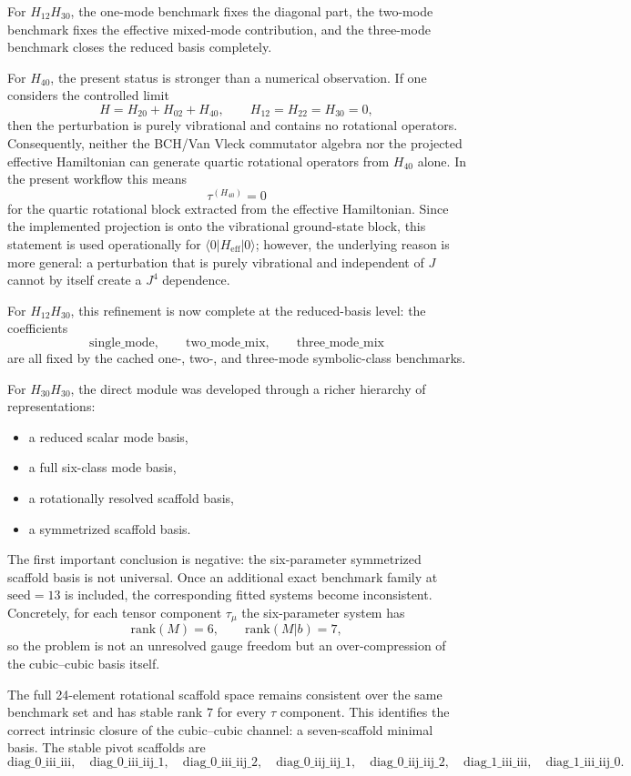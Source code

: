 \documentclass[11pt,a4paper]{article}
\begin{document}
For \(H_{12}H_{30}\), the one-mode benchmark fixes the diagonal part, the two-mode benchmark fixes the effective mixed-mode contribution, and the three-mode benchmark closes the reduced basis completely.

For \(H_{40}\), the present status is stronger than a numerical observation. If one considers the controlled limit
\[
H = H_{20}+H_{02}+H_{40},
\qquad
H_{12}=H_{22}=H_{30}=0,
\]
then the perturbation is purely vibrational and contains no rotational operators. Consequently, neither the BCH/Van Vleck commutator algebra nor the projected effective Hamiltonian can generate quartic rotational operators from \(H_{40}\) alone. In the present workflow this means
\[
\tau^{(H_{40})}=0
\]
for the quartic rotational block extracted from the effective Hamiltonian. Since the implemented projection is onto the vibrational ground-state block, this statement is used operationally for \(\langle 0|H_{\mathrm{eff}}|0\rangle\); however, the underlying reason is more general: a perturbation that is purely vibrational and independent of \(J\) cannot by itself create a \(J^4\) dependence.

For \(H_{12}H_{30}\), this refinement is now complete at the reduced-basis level: the coefficients
\[
\mathrm{single\_mode},\qquad \mathrm{two\_mode\_mix},\qquad \mathrm{three\_mode\_mix}
\]
are all fixed by the cached one-, two-, and three-mode symbolic-class benchmarks.

For \(H_{30}H_{30}\), the direct module was developed through a richer hierarchy of representations:
\begin{itemize}[leftmargin=*]
\item a reduced scalar mode basis,
\item a full six-class mode basis,
\item a rotationally resolved scaffold basis,
\item a symmetrized scaffold basis.
\end{itemize}

The first important conclusion is negative: the six-parameter symmetrized scaffold basis is not universal. Once an additional exact benchmark family at \(\mathrm{seed}=13\) is included, the corresponding fitted systems become inconsistent. Concretely, for each tensor component \(\tau_\mu\) the six-parameter system has
\[
\mathrm{rank}(M)=6,\qquad \mathrm{rank}(M|b)=7,
\]
so the problem is not an unresolved gauge freedom but an over-compression of the cubic--cubic basis itself.

The full 24-element rotational scaffold space remains consistent over the same benchmark set and has stable rank \(7\) for every \(\tau\) component. This identifies the correct intrinsic closure of the cubic--cubic channel: a seven-scaffold minimal basis. The stable pivot scaffolds are
\[
\mathrm{diag\_0\_iii\_iii},\quad
\mathrm{diag\_0\_iii\_iij\_1},\quad
\mathrm{diag\_0\_iii\_iij\_2},\quad
\mathrm{diag\_0\_iij\_iij\_1},\quad
\mathrm{diag\_0\_iij\_iij\_2},\quad
\mathrm{diag\_1\_iii\_iii},\quad
\mathrm{diag\_1\_iii\_iij\_0}.
\]
\end{document}
